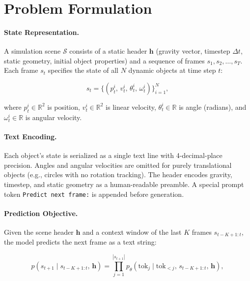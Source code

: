 \documentclass{article}
\newcommand{\vh}{\mathbf{h}}
\newcommand{\R}{\mathbb{R}}
\begin{document}
\section{Problem Formulation}
\label{sec:problem}

\paragraph{State Representation.}
A simulation scene $\mathcal{S}$ consists of a static header $\vh$ (gravity vector,
timestep $\Delta t$, static geometry, initial object properties) and a sequence of
frames $s_1, s_2, \ldots, s_T$. Each frame $s_t$ specifies the state of all $N$
dynamic objects at time step $t$:

\begin{equation}
s_t = \bigl\{ (p_t^i,\, v_t^i,\, \theta_t^i,\, \omega_t^i) \bigr\}_{i=1}^{N},
\end{equation}

where $p_t^i \in \R^2$ is position, $v_t^i \in \R^2$ is linear velocity, $\theta_t^i
\in \R$ is angle (radians), and $\omega_t^i \in \R$ is angular velocity.

\paragraph{Text Encoding.}
Each object's state is serialized as a single text line with 4-decimal-place
precision. Angles and angular velocities are omitted for purely translational
objects (e.g., circles with no rotation tracking). The header encodes gravity,
timestep, and static geometry as a human-readable preamble. A special prompt token
\texttt{Predict next frame:} is appended before generation.

\paragraph{Prediction Objective.}
Given the scene header $\vh$ and a context window of the last $K$ frames
$s_{t-K+1:t}$, the model predicts the next frame as a text string:

\begin{equation}
p\!\left(s_{t+1} \mid s_{t-K+1:t},\, \vh\right) =
\prod_{j=1}^{|s_{t+1}|} p_\theta\!\left(\text{tok}_j \mid \text{tok}_{<j},\, s_{t-K+1:t},\, \vh\right),
\end{equation}
\end{document}
